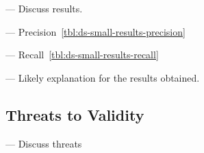 --- Discuss results. ~ \vspace{3mm}



--- Precision~\ref{tbl:ds-small-results-precision}  \vspace{3mm}


--- Recall~\ref{tbl:ds-small-results-recall} \vspace{3mm}

--- Likely explanation for the results obtained.










\subsection{Threats to Validity}

--- Discuss threats \vspace{3mm}



